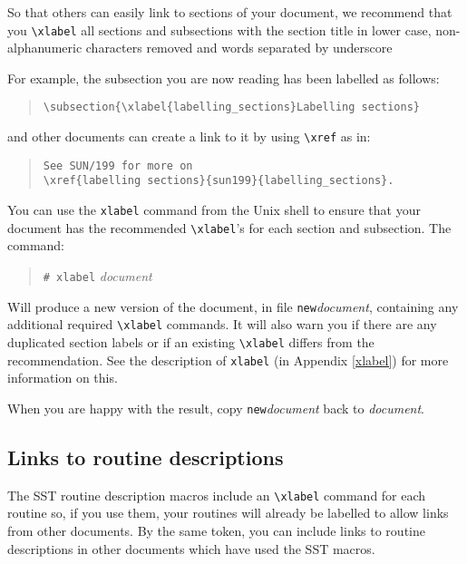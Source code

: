 \documentclass[twoside,11pt]{article}
\newcommand{\htmlref}[2]{#1}
\newcommand{\latex}[1]{#1}
\newcommand{\xref}[3]{#1}
\newcommand{\xlabel}[1]{}
\renewcommand{\_}{\texttt{\symbol{95}}}
\begin{document}
So that others can easily link to sections of your document,
we recommend that you \verb+\xlabel+ all sections and subsections
with the section title in lower case, non-alphanumeric characters removed and
words separated by underscore

For example, the subsection you are now reading has been labelled as follows:

\begin{quote}
\verb+\subsection{\xlabel{labelling_sections}Labelling sections}+
\end{quote}

and other documents can create a link to it by using \verb+\xref+ as in:

\begin{quote}
\begin{verbatim}
See SUN/199 for more on
\xref{labelling sections}{sun199}{labelling_sections}.
\end{verbatim}
\end{quote}

You can use the \texttt{xlabel} command from the Unix shell to ensure that your
document has the recommended \verb+\xlabel+'s for each section and subsection.
The command:
\begin{quote}
\texttt{\# xlabel} \textit{document}
\end{quote}
Will produce a new version of the document, in file
\texttt{new}\textit{document},
containing any additional required \verb+\xlabel+ commands.
It will also warn you if there are any duplicated section labels or if an
existing  \verb+\xlabel+ differs from the recommendation.
See the
\htmlref{description of \texttt{xlabel}}{xlabel}
\latex{(in Appendix \ref{xlabel})} for more information on this.

When you are happy with the result, copy \texttt{new}\textit{document} back to
\textit{document}.

\subsection{\xlabel{links_to_routine_descriptions}Links to routine descriptions}

The SST routine description macros include an \verb#\xlabel# command for
each routine so, if you use them, your routines will
already be labelled to allow links from other documents. By the same token,
you can include links to routine descriptions in other documents which have
used the SST macros.
\end{document}
